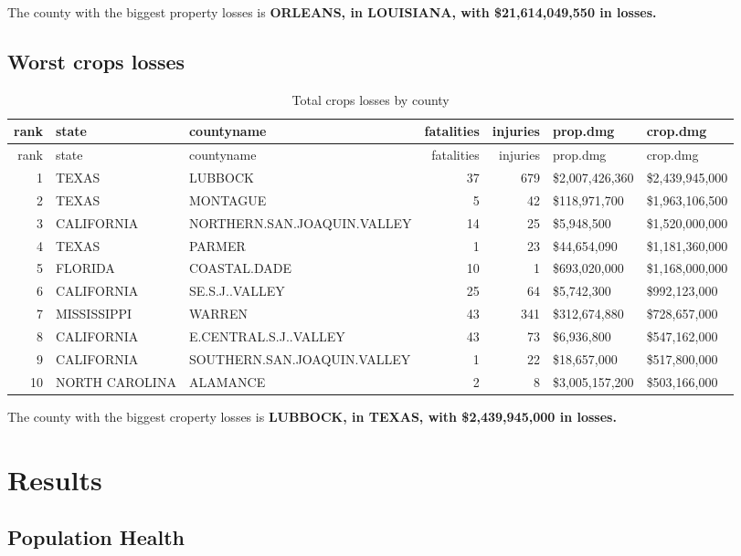 \documentclass[]{article}
\begin{document}
The county with the biggest property losses is \textbf{ORLEANS, in
LOUISIANA, with \$21,614,049,550 in losses.}

\subsection{Worst crops losses}\label{worst-crops-losses}

\begin{longtable}[]{@{}rllrrll@{}}
\caption{Total crops losses by county}\tabularnewline
\toprule
rank & state & countyname & fatalities & injuries & prop.dmg &
crop.dmg\tabularnewline
\midrule
\endfirsthead
\toprule
rank & state & countyname & fatalities & injuries & prop.dmg &
crop.dmg\tabularnewline
\midrule
\endhead
1 & TEXAS & LUBBOCK & 37 & 679 & \$2,007,426,360 &
\$2,439,945,000\tabularnewline
2 & TEXAS & MONTAGUE & 5 & 42 & \$118,971,700 &
\$1,963,106,500\tabularnewline
3 & CALIFORNIA & NORTHERN.SAN.JOAQUIN.VALLEY & 14 & 25 & \$5,948,500 &
\$1,520,000,000\tabularnewline
4 & TEXAS & PARMER & 1 & 23 & \$44,654,090 &
\$1,181,360,000\tabularnewline
5 & FLORIDA & COASTAL.DADE & 10 & 1 & \$693,020,000 &
\$1,168,000,000\tabularnewline
6 & CALIFORNIA & SE.S.J..VALLEY & 25 & 64 & \$5,742,300 &
\$992,123,000\tabularnewline
7 & MISSISSIPPI & WARREN & 43 & 341 & \$312,674,880 &
\$728,657,000\tabularnewline
8 & CALIFORNIA & E.CENTRAL.S.J..VALLEY & 43 & 73 & \$6,936,800 &
\$547,162,000\tabularnewline
9 & CALIFORNIA & SOUTHERN.SAN.JOAQUIN.VALLEY & 1 & 22 & \$18,657,000 &
\$517,800,000\tabularnewline
10 & NORTH CAROLINA & ALAMANCE & 2 & 8 & \$3,005,157,200 &
\$503,166,000\tabularnewline
\bottomrule
\end{longtable}

The county with the biggest croperty losses is \textbf{LUBBOCK, in
TEXAS, with \$2,439,945,000 in losses.}

\section{Results}\label{results}

\subsection{Population Health}\label{population-health}
\end{document}
